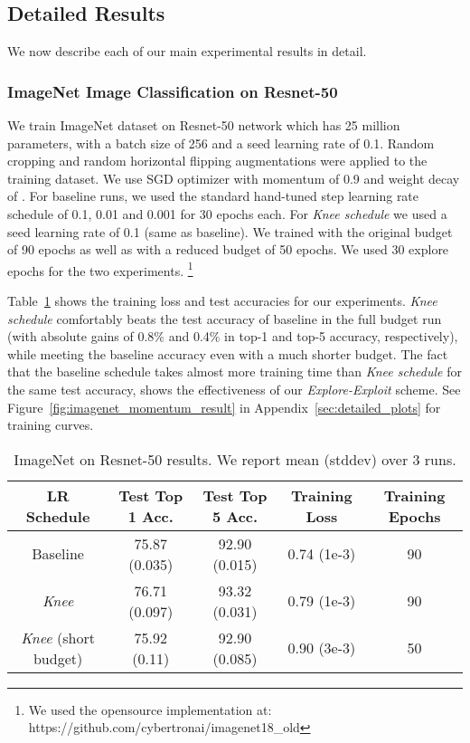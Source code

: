 \documentclass[twoside,11pt]{article}
\newcommand{\lrschedule}{\textit{Knee schedule}}
\newcommand{\lrscheduleshort}{\textit{Knee}}
\begin{document}
\subsection{Detailed Results}

We now describe each of our main experimental results in detail.

\subsubsection{ImageNet Image Classification on Resnet-50}

We train ImageNet dataset \citep{imagenet-dataset} on Resnet-50 network \citep{resnet_he_2016} which has 25 million parameters, with a batch size of 256 and a seed learning rate of 0.1. Random cropping and random horizontal flipping augmentations were applied to the training dataset.  We use SGD optimizer with momentum of 0.9 and weight decay of .
For baseline runs, we used the standard hand-tuned step learning rate schedule of 0.1, 0.01 and 0.001 for 30 epochs each. For \lrschedule{} we used a seed learning rate of 0.1 (same as baseline). We trained with the original budget of 90 epochs as well as with a reduced budget of 50 epochs. We used 30 explore epochs for the two experiments. \footnote{We used the opensource implementation at: https://github.com/cybertronai/imagenet18\_old}

Table~\ref{tab:imagenet_test_training_loss} shows the training loss and test accuracies for our experiments. \lrschedule{} comfortably beats the test accuracy of baseline in the full budget run
(with absolute gains of 0.8\% and 0.4\% in top-1 and top-5 accuracy, respectively), while meeting the baseline accuracy even with a much shorter budget. The fact that the baseline schedule takes almost  more training time than \lrschedule{} for the same test accuracy, shows the effectiveness of our \textit{Explore-Exploit} scheme.
See Figure~\ref{fig:imagenet_momentum_result} in Appendix~\ref{sec:detailed_plots} for training curves.

\begin{table}[h]
\small
\centering
\caption{ImageNet on Resnet-50 results. We report mean (stddev) over 3 runs.}
\label{tab:imagenet_test_training_loss}
\begin{tabular}{ccccc}
\toprule
\multirow{1}{*}{LR Schedule}  & Test Top 1 Acc. & Test Top 5 Acc. & Training Loss & Training Epochs\\
\midrule
Baseline     & \multirow{1}{*}{75.87 (0.035)} & \multirow{1}{*}{92.90 (0.015)} & \multirow{1}{*}{0.74 (1e-3)} & 90\\
\lrscheduleshort{}     & \multirow{1}{*}{76.71 (0.097)} & \multirow{1}{*}{93.32 (0.031)} & \multirow{1}{*}{0.79 (1e-3)} & 90\\
\lrscheduleshort{} (short budget)    & \multirow{1}{*}{75.92 (0.11)} & \multirow{1}{*}{92.90 (0.085)} & \multirow{1}{*}{0.90 (3e-3)} & 50\\
\bottomrule
\end{tabular}
\end{table}
\end{document}
